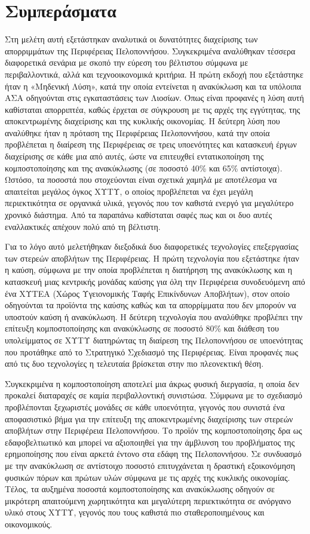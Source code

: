 \documentclass[12pt]{article}
\begin{document}
 	\section{Συμπεράσματα}
 	
 	Στη μελέτη αυτή εξετάστηκαν αναλυτικά οι δυνατότητες διαχείρισης των απορριμμάτων της Περιφέρειας Πελοποννήσου. Συγκεκριμένα αναλύθηκαν τέσσερα διαφορετικά σενάρια με σκοπό την εύρεση του βέλτιστου σύμφωνα με περιβαλλοντικά, αλλά και τεχνοοικονομικά κριτήρια. Η πρώτη εκδοχή που εξετάστηκε ήταν η «Μηδενική Λύση», κατά την οποία εντείνεται η ανακύκλωση και τα υπόλοιπα ΑΣΑ οδηγούνται στις εγκαταστάσεις των Λιοσίων. Όπως είναι προφανές η λύση αυτή καθίσταται απορριπτέα, καθώς έρχεται σε σύγκρουση με τις  αρχές της εγγύτητας, της αποκεντρωμένης διαχείρισης και της κυκλικής οικονομίας. Η δεύτερη λύση που αναλύθηκε ήταν η πρόταση της Περιφέρειας Πελοποννήσου, κατά την οποία προβλέπεται η διαίρεση της Περιφέρειας σε τρεις υποενότητες και κατασκευή έργων διαχείρισης σε κάθε μια από αυτές, ώστε να επιτευχθεί εντατικοποίηση της κομποστοποίησης και της ανακύκλωσης (σε ποσοστό 40\% και 65\% αντίστοιχα). Ωστόσο, τα ποσοστά που στοχεύονται είναι σχετικά χαμηλά με αποτέλεσμα να απαιτείται μεγάλος όγκος ΧΥΤΥ, ο οποίος προβλέπεται να έχει μεγάλη περιεκτικότητα σε οργανικά υλικά, γεγονός που τον καθιστά ενεργό για μεγαλύτερο χρονικό διάστημα. Από τα παραπάνω καθίσταται σαφές πως και οι δυο αυτές εναλλακτικές απέχουν πολύ από τη βέλτιστη. 
 	
 	Για το λόγο αυτό μελετήθηκαν διεξοδικά δυο διαφορετικές τεχνολογίες επεξεργασίας των στερεών αποβλήτων της Περιφέρειας. Η πρώτη τεχνολογία που εξετάστηκε ήταν η καύση, σύμφωνα με την οποία προβλέπεται η διατήρηση της ανακύκλωσης και η κατασκευή μιας κεντρικής μονάδας καύσης για όλη την Περιφέρεια συνοδευόμενη από ένα ΧΥΤΕΑ (Χώρος Υγειονομικής Ταφής Επικίνδυνων Αποβλήτων), στον οποίο οδηγούνται τα προϊόντα της καύσης καθώς και τα απορρίμματα που δεν μπορούν να υποστούν καύση ή ανακύκλωση. Η δεύτερη τεχνολογία που αναλύθηκε προβλέπει την επίτευξη  κομποστοποίησης και ανακύκλωσης σε ποσοστό 80\% και διάθεση του υπολείμματος σε ΧΥΤΥ διατηρώντας τη διαίρεση της Πελοποννήσου σε υποενότητας που προτάθηκε από το Στρατηγικό Σχεδιασμό της Περιφέρειας. Είναι προφανές πως από τις δυο τεχνολογίες η τελευταία βρίσκεται στην πιο πλεονεκτική θέση. 
 	
 	Συγκεκριμένα η κομποστοποίηση αποτελεί μια άκρως φυσική διεργασία, η οποία δεν προκαλεί διαταραχές σε καμία περιβαλλοντική συνιστώσα. Σύμφωνα με το σχεδιασμό προβλέπονται ξεχωριστές μονάδες σε κάθε υποενότητα, γεγονός που συνιστά ένα αποφασιστικό βήμα για την επίτευξη της αποκεντρωμένης διαχείρισης των στερεών αποβλήτων στην Περιφέρεια Πελοποννήσου. Το προϊόν της κομποστοποίησης δρα ως εδαφοβελτιωτικό και μπορεί να αξιοποιηθεί για την άμβλυνση του προβλήματος της ερημοποίησης που είναι αρκετά έντονο στα εδάφη της Πελοποννήσου. Σε συνδυασμό με την ανακύκλωση σε αντίστοιχο ποσοστό επιτυγχάνεται η δραστική εξοικονόμηση φυσικών πόρων και πρώτων υλών σύμφωνα με τις αρχές της κυκλικής οικονομίας. Τέλος, τα αυξημένα ποσοστά κομποστοποίησης και ανακύκλωσης οδηγούν σε μικρότερη απαιτούμενη χωρητικότητα και μεγαλύτερη περιεκτικότητα σε ανόργανο υλικό στους ΧΥΤΥ, γεγονός που τους καθιστά πιο σταθεροποιημένους και οικονομικούς.  
 	
\end{document}
